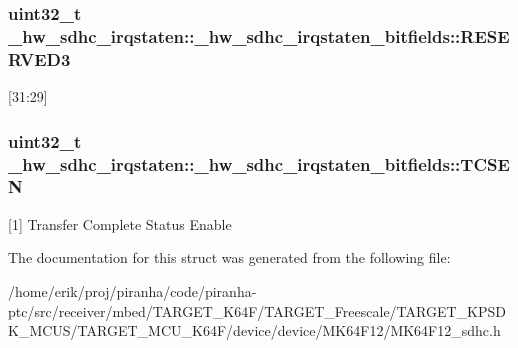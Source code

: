 \subsubsection[{\texorpdfstring{R\+E\+S\+E\+R\+V\+E\+D3}{RESERVED3}}]{\setlength{\rightskip}{0pt plus 5cm}uint32\+\_\+t \+\_\+hw\+\_\+sdhc\+\_\+irqstaten\+::\+\_\+hw\+\_\+sdhc\+\_\+irqstaten\+\_\+bitfields\+::\+R\+E\+S\+E\+R\+V\+E\+D3}\hypertarget{struct__hw__sdhc__irqstaten_1_1__hw__sdhc__irqstaten__bitfields_a45030eab01268f39ddd8005cd9e28e4e}{}\label{struct__hw__sdhc__irqstaten_1_1__hw__sdhc__irqstaten__bitfields_a45030eab01268f39ddd8005cd9e28e4e}
\mbox{[}31\+:29\mbox{]} 
\subsubsection[{\texorpdfstring{T\+C\+S\+EN}{TCSEN}}]{\setlength{\rightskip}{0pt plus 5cm}uint32\+\_\+t \+\_\+hw\+\_\+sdhc\+\_\+irqstaten\+::\+\_\+hw\+\_\+sdhc\+\_\+irqstaten\+\_\+bitfields\+::\+T\+C\+S\+EN}\hypertarget{struct__hw__sdhc__irqstaten_1_1__hw__sdhc__irqstaten__bitfields_ab6a1e43a81cb8354baa75af2fc7a3df1}{}\label{struct__hw__sdhc__irqstaten_1_1__hw__sdhc__irqstaten__bitfields_ab6a1e43a81cb8354baa75af2fc7a3df1}
\mbox{[}1\mbox{]} Transfer Complete Status Enable 

The documentation for this struct was generated from the following file\+:\begin{DoxyCompactItemize}
\item 
/home/erik/proj/piranha/code/piranha-\/ptc/src/receiver/mbed/\+T\+A\+R\+G\+E\+T\+\_\+\+K64\+F/\+T\+A\+R\+G\+E\+T\+\_\+\+Freescale/\+T\+A\+R\+G\+E\+T\+\_\+\+K\+P\+S\+D\+K\+\_\+\+M\+C\+U\+S/\+T\+A\+R\+G\+E\+T\+\_\+\+M\+C\+U\+\_\+\+K64\+F/device/device/\+M\+K64\+F12/M\+K64\+F12\+\_\+sdhc.\+h\end{DoxyCompactItemize}
